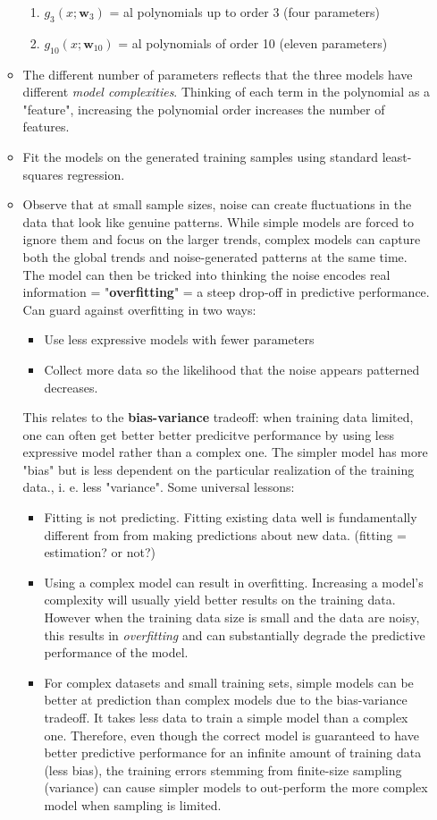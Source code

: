 \documentclass[norsk,a4paper,11pt]{article}
\begin{document}
\begin{itemize}
\begin{itemize}
\begin{enumerate}[i]
				\item $g_3 (x; \mathbf{w}_3)$ = al polynomials up to order 3 (four parameters)
				\item $g_{10} (x; \mathbf{w}_{10})$ = al polynomials of order 10 (eleven parameters)
			\end{enumerate}
			\item The different number of parameters reflects that the three models have different \textit{model complexities}. Thinking of each term in the polynomial as a "feature", increasing the polynomial order increases the number of features.
			\item Fit the models on the generated training samples using standard least-squares regression.
			\item Observe that at small sample sizes, noise can create fluctuations in the data that look like genuine patterns. While simple models are forced to ignore them and focus on the larger trends, complex models can capture both the global trends and noise-generated patterns at the same time. The model can then be tricked into thinking the noise encodes real information = "\textbf{overfitting}" = a steep drop-off in predictive performance.
			Can guard against overfitting in two ways:
			\begin{itemize}
				\item Use less expressive models with fewer parameters
				\item Collect more data so the likelihood that the noise appears patterned decreases. 
			\end{itemize}
			This relates to the \textbf{bias-variance} tradeoff: when training data limited, one can often get better better predicitve performance by using less expressive model rather than a complex one. The simpler model has more "bias" but is less dependent on the particular realization of the training data., i. e. less "variance". Some universal lessons:
			\begin{itemize}
				\item Fitting is not predicting. Fitting existing data well is fundamentally different from from making predictions about new data. (fitting = estimation? or not?)
				\item Using a complex model can result in overfitting. Increasing a model's complexity will usually yield better results on the training data. However when the training data size is small and the data are noisy, this results in \textit{overfitting} and can substantially degrade the predictive performance of the model.
				\item For complex datasets and small training sets, simple models can be better at prediction than complex models due to the bias-variance tradeoff. It takes less data to train a simple model than a complex one. Therefore, even though the correct model is guaranteed to have better predictive performance for an infinite amount of training data (less bias), the training errors stemming from finite-size sampling (variance) can cause simpler models to out-perform the more complex model when sampling is limited. 

\end{itemize}
\end{itemize}
\end{itemize}
\end{document}
